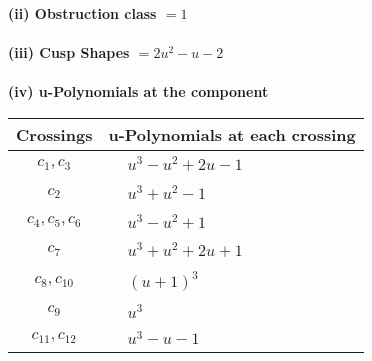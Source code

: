 \documentclass[1p]{elsarticle_modified}
\theoremstyle{definition}
\begin{document}
\flushleft \textbf{(ii) Obstruction class $= 1$}\\~\\
\flushleft \textbf{(iii) Cusp Shapes $= 2 u^2- u-2$}\\~\\
\newpage\renewcommand{\arraystretch}{1}
\flushleft \textbf{(iv) u-Polynomials at the component}\newline \\
\begin{tabular}{m{50pt}|m{274pt}}
Crossings & \hspace{64pt}u-Polynomials at each crossing \\
\hline $$\begin{aligned}c_{1},c_{3}\end{aligned}$$&$\begin{aligned}
&u^3- u^2+2 u-1
\end{aligned}$\\
\hline $$\begin{aligned}c_{2}\end{aligned}$$&$\begin{aligned}
&u^3+u^2-1
\end{aligned}$\\
\hline $$\begin{aligned}c_{4},c_{5},c_{6}\end{aligned}$$&$\begin{aligned}
&u^3- u^2+1
\end{aligned}$\\
\hline $$\begin{aligned}c_{7}\end{aligned}$$&$\begin{aligned}
&u^3+u^2+2 u+1
\end{aligned}$\\
\hline $$\begin{aligned}c_{8},c_{10}\end{aligned}$$&$\begin{aligned}
&(u+1)^3
\end{aligned}$\\
\hline $$\begin{aligned}c_{9}\end{aligned}$$&$\begin{aligned}
&u^3
\end{aligned}$\\
\hline $$\begin{aligned}c_{11},c_{12}\end{aligned}$$&$\begin{aligned}
&u^3- u-1
\end{aligned}$\\
\hline
\end{tabular}\\~\\
\end{document}

